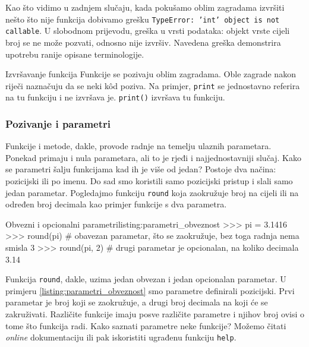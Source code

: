Kao što vidimo u zadnjem slučaju, kada pokušamo oblim zagradama izvršiti nešto što nije funkcija dobivamo grešku \texttt{TypeError: 'int' object is not callable}. U slobodnom prijevodu, greška u vrsti podataka: objekt vrste cijeli broj se ne može pozvati, odnosno nije izvršiv. Navedena greška demonstrira upotrebu ranije opisane terminologije.

\begin{important}{Izvršavanje funkcija}
Funkcije se pozivaju oblim zagradama. Oble zagrade nakon riječi naznačuju da se neki kôd poziva. Na primjer, \texttt{print} se jednostavno referira na tu funkciju i ne
izvršava je. \texttt{print()} izvršava tu funkciju.
\end{important}


\subsubsection{Pozivanje i parametri}

Funkcije i metode, dakle, provode radnje na temelju ulaznih parametara. Ponekad primaju i nula parametara, ali to je rjeđi i najjednostavniji slučaj. Kako se parametri šalju funkcijama kad ih je više od jedan? Postoje dva načina: pozicijski ili po imenu. Do sad smo koristili samo pozicijski pristup i slali samo jedan parametar. Pogledajmo funkciju \texttt{round} koja zaokružuje broj na cijeli ili na određen broj decimala kao primjer funkcije s dva parametra.


\begin{python}{Obvezni i opcionalni parametri}{listing:parametri_obveznost}
>>> pi = 3.1416
>>> round(pi)  # obavezan parametar, što se zaokružuje, bez toga radnja nema smisla
3
>>> round(pi, 2)  # drugi parametar je opcionalan, na koliko decimala
3.14
\end{python}


Funkcija \texttt{round}, dakle, uzima jedan obvezan i jedan opcionalan parametar. U primjeru \ref{listing:parametri_obveznost} smo parametre definirali pozicijski. Prvi parametar je broj koji se zaokružuje, a drugi broj decimala na koji će se zakruživati. Različite funkcije imaju posve različite parametre i njihov broj ovisi o tome što funkcija radi. Kako saznati parametre neke funkcije? Možemo čitati \textit{online} dokumentaciju ili pak iskoristiti ugrađenu funkciju \texttt{help}.

